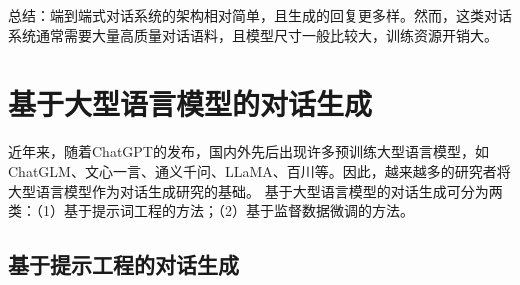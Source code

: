 总结：端到端式对话系统的架构相对简单，且生成的回复更多样。然而，这类对话系统通常需要大量高质量对话语料，且模型尺寸一般比较大，训练资源开销大。










\section{基于大型语言模型的对话生成}

近年来，随着ChatGPT\cite{DBLP:conf/nips/Ouyang0JAWMZASR22}的发布，国内外先后出现许多预训练大型语言模型，如ChatGLM\cite{DBLP:conf/iclr/ZengLDWL0YXZXTM23}、文心一言\cite{DBLP:journals/corr/abs-2107-02137}、通义千问\cite{DBLP:journals/corr/abs-2309-16609}、LLaMA\cite{DBLP:journals/corr/abs-2302-13971}、百川\cite{DBLP:journals/corr/abs-2309-10305}等。因此，越来越多的研究者将大型语言模型作为对话生成研究的基础。
基于大型语言模型的对话生成可分为两类：（1）基于提示词工程的方法；（2）基于监督数据微调的方法。

\subsection{基于提示工程的对话生成}

